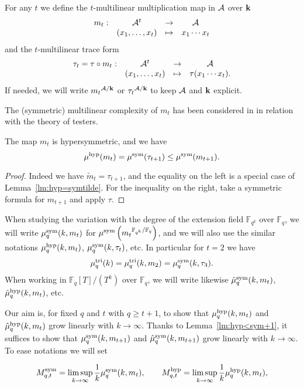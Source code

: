 \documentclass[11pt]{article}
\begin{document}
For any $t$ we define the $t$-multilinear multiplication map in $\mathcal{A}$ over $\mathbf{k}$
\[
\begin{array}{cccc}
m_t:&\mathcal{A}^t&\to&\mathcal{A}\\
&(x_1,\dots,x_t)&\mapsto&x_1\cdots x_t
\end{array}
\]
and the $t$-multilinear trace form
\[
\begin{array}{cccc}
\tau_t=\tau\circ m_t:&\mathcal{A}^t&\to&\mathcal{A}\\
&(x_1,\dots,x_t)&\mapsto&\tau(x_1\cdots x_t).
\end{array}
\]
If needed, we will write ${m_t}^{\mathcal{A}/\mathbf{k}}$ or ${\tau_t}^{\mathcal{A}/\mathbf{k}}$ to keep $\mathcal{A}$ and $\mathbf{k}$ explicit. 

The (symmetric) multilinear complexity of $m_t$ has been considered in \cite{Bshouty13} in relation with the theory of testers.

\begin{lm}
\label{lm:hyp<sym+1}
The map $m_t$ is hypersymmetric, and we have
\[
\mu^{\textrm{hyp}}(m_t)=\mu^{\textrm{sym}}(\tau_{t+1})\leq\mu^{\textrm{sym}}(m_{t+1}).
\] 
\end{lm}
\begin{proof}
Indeed we have $\widetilde{m}_t=\tau_{t+1}$, and the equality on the left is a special case of Lemma~\ref{lm:hyp=symtilde}.
For the inequality on the right, take a symmetric formula for $m_{t+1}$ and apply $\tau$.
\end{proof}

When studying the variation with the degree of the extension field $\mathbb{F}_{q^k}$ over $\mathbb{F}_q$,
we will write $\mu^{\textrm{sym}}_q(k,m_t)$ for $\mu^{\textrm{sym}}\left({m_t}^{\mathbb{F}_{q^k}/\mathbb{F}_q}\right)$,
and we will also use the similar notations $\mu^{\textrm{hyp}}_q(k,m_t)$, $\mu^{\textrm{sym}}_q(k,\tau_t)$, etc.
In particular for $t=2$ we have
\[
\mutri_q(k)=\mutri_q(k,m_2)=\musym_q(k,\tau_3). %
\]
When working in $\mathbb{F}_q[T]/(T^k)$ over $\mathbb{F}_q$,
we will write likewise $\hat\mu^{\textrm{sym}}_q(k,m_t)$, $\hat\mu^{\textrm{hyp}}_q(k,m_t)$, etc.

Our aim is, for fixed $q$ and $t$ with $q\geq t+1$, to show that $\mu^{\textrm{hyp}}_q(k,m_t)$ and $\hat\mu^{\textrm{hyp}}_q(k,m_t)$ grow linearly with $k\to\infty$.
Thanks to Lemma~\ref{lm:hyp<sym+1}, it suffices to show that
$\mu^{\textrm{sym}}_q(k,m_{t+1})$ and $\hat\mu^{\textrm{sym}}_q(k,m_{t+1})$ grow linearly with $k\to\infty$.
To ease notations we will set
\vspace{-.5\baselineskip}

\[ M^{\textrm{sym}}_{q,t}=\limsup_{k\to\infty}\frac{1}{k}\mu^{\textrm{sym}}_q(k,m_t),\qquad M^{\textrm{hyp}}_{q,t}=\limsup_{k\to\infty}\frac{1}{k}\mu^{\textrm{hyp}}_q(k,m_t), \]
\vspace{-1.5\baselineskip}
\end{document}
